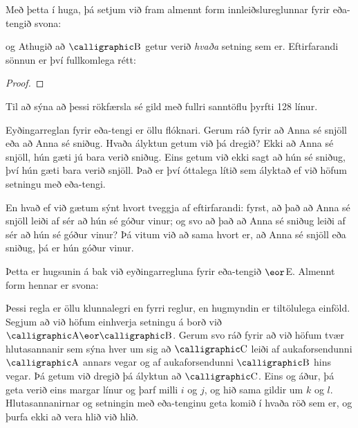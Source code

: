Með þetta í huga, þá setjum við fram almennt form innleiðslureglunnar fyrir eða-tengið svona:

og
Athugið að $\meta{B}$ getur verið \emph{hvaða} setning sem er. Eftirfarandi sönnun er því fullkomlega rétt:
\begin{proof}
\end{proof}
Til að sýna að þessi rökfærsla sé gild með fullri sanntöflu þyrfti 128 línur.

Eyðingarreglan fyrir eða-tengi er öllu flóknari. Gerum ráð fyrir að Anna sé snjöll eða að Anna sé sniðug. Hvaða ályktun getum við þá dregið? Ekki að Anna sé snjöll, hún gæti jú bara verið sniðug. Eins getum við ekki sagt að hún sé sniðug, því hún gæti bara verið snjöll. Það er því óttalega lítið sem ályktað ef við höfum setningu með eða-tengi.

En hvað ef við gætum sýnt hvort tveggja af eftirfarandi: fyrst, að það að Anna sé snjöll leiði af sér að hún sé góður vinur; og svo að það að Anna sé sniðug leiði af sér að hún sé góður vinur? Þá vitum við að sama hvort er, að Anna sé snjöll eða sniðug, þá er hún góður vinur. 

Þetta er hugsunin á bak við eyðingarregluna fyrir eða-tengið $\eor$E. Almennt form hennar er svona:

	
Þessi regla er öllu klunnalegri en fyrri reglur, en hugmyndin er tiltölulega einföld. Segjum að við höfum einhverja setningu á borð við $\meta{A} \eor \meta{B}$. Gerum svo ráð fyrir að við höfum tvær hlutasannanir sem sýna hver um sig að $\meta{C}$ leiði af aukaforsendunni $\meta{A}$ annars vegar og af aukaforsendunni $\meta{B}$ hins vegar. Þá getum við dregið þá ályktun að $\meta{C}$. Eins og áður, þá geta verið eins margar línur og þarf milli $i$ og $j$, og hið sama gildir um $k$ og $l$. Hlutasannanirnar og setningin með eða-tenginu geta komið í hvaða röð sem er, og þurfa ekki að vera hlið við hlið.	
	
